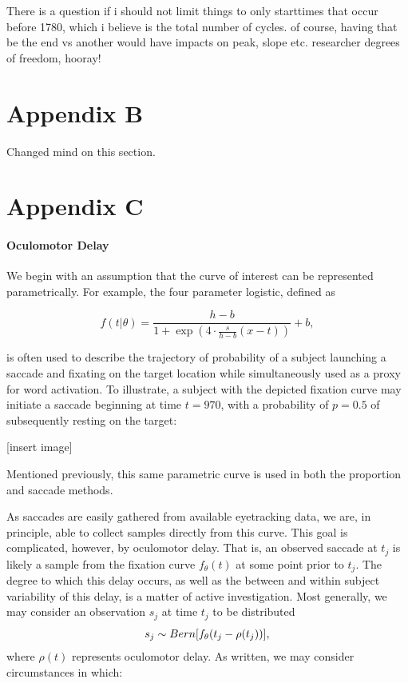 \documentclass{article}
\begin{document}
There is a question if i should not limit things to only starttimes that occur before 1780, which i believe is the total number of cycles. of course, having that be the end vs another would have impacts on peak, slope etc. researcher degrees of freedom, hooray! 

\section*{Appendix B}

Changed mind on this section.

\section*{Appendix C}

\paragraph{Oculomotor Delay}


We begin with an assumption that the curve of interest can be represented parametrically. For example, the four parameter logistic, defined as

$$
f(t|\theta) = \frac{h-b}{1 + \exp\left(4 \cdot \frac{s}{h-b}(x - t) \right)} +b,
$$ 

is often used to describe the trajectory of probability of a subject launching a saccade and fixating on the target location while simultaneously used as a proxy for word activation. To illustrate, a subject with the depicted fixation curve may initiate a saccade beginning at time $t = 970$, with a probability of $p = 0.5$ of subsequently resting on the target:

[insert image]


Mentioned previously, this same parametric curve is used in both the proportion and saccade methods.

As saccades are easily gathered from available eyetracking data, we are, in principle, able to collect samples directly from this curve. This goal is complicated, however, by oculomotor delay. That is, an observed saccade at $t_j$ is likely a sample from the fixation curve $f_{\theta}(t)$ at some point prior to $t_j$. The degree to which this delay occurs, as well as the between and within subject variability of this delay, is a matter of active investigation. Most generally, we may consider an observation $s_j$ at time $t_j$ to be distributed
$$
s_j \sim  Bern \large[f_{\theta}(t_j - \rho(t_j)) \large],
$$ 
where $\rho(t)$ represents oculomotor delay. As written, we may consider circumstances in which:
\end{document}
